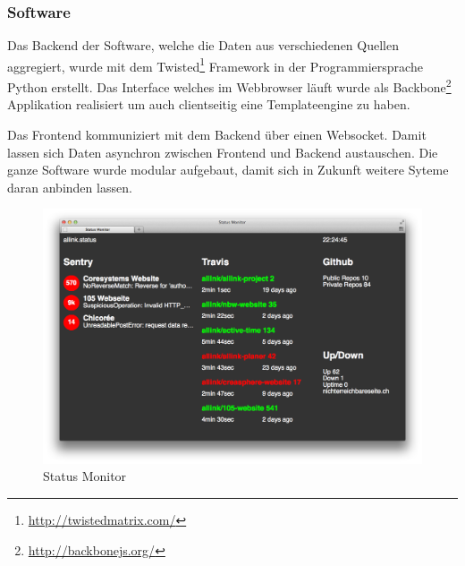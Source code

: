 \subsubsection{Software}
\label{ssub:software}
Das Backend der Software, welche die Daten aus verschiedenen Quellen aggregiert, wurde mit dem Twisted\footnote{\url{http://twistedmatrix.com/}} Framework in der Programmiersprache Python erstellt. Das Interface welches im Webbrowser läuft wurde als Backbone\footnote{\url{http://backbonejs.org/}} Applikation realisiert um auch clientseitig eine Templateengine zu haben.

Das Frontend kommuniziert mit dem Backend über einen Websocket. Damit lassen sich Daten asynchron zwischen Frontend und Backend austauschen. Die ganze Software wurde modular aufgebaut, damit sich in Zukunft weitere Syteme daran anbinden lassen.

\begin{figure}[ht]
\centering
\includegraphics[width=1\textwidth]{images/status_monitor.png}
\caption{Status Monitor}
\label{fig:status_monitor}
\end{figure}
